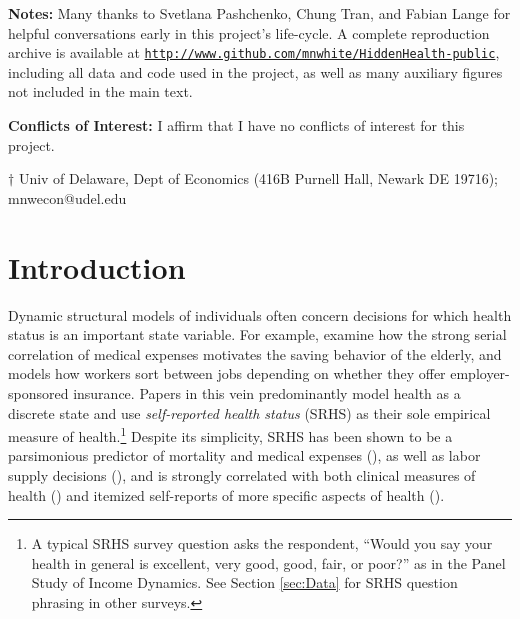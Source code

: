 \documentclass[12pt,pdftex,letterpaper]{article}
\begin{document}
\vspace{0.5cm}
\begin{singlespace}
	\noindent \textbf{Notes:} Many thanks to Svetlana Pashchenko, Chung Tran, and Fabian Lange for helpful conversations early in this project's life-cycle.  A complete reproduction archive is available at \href{http://www.github.com/mnwhite/HiddenHealth-public}{\texttt{http://www.github.com/mnwhite/HiddenHealth-public}}, including all data and code used in the project, as well as many auxiliary figures not included in the main text.
	
	\vspace{0.5cm}
	
	\noindent \textbf{Conflicts of Interest:} I affirm that I have no conflicts of interest for this project.
	
	\vspace{1cm}
	
	\small
	\noindent $\dagger$ Univ of Delaware, Dept of Economics (416B Purnell Hall, Newark DE 19716);  mnwecon@udel.edu
\end{singlespace}


\thispagestyle{empty}

\newpage

\setcounter{page}{1}


\newlength{\TableWidth}

\section{Introduction}\label{sec:Intro}

Dynamic structural models of individuals often concern decisions for which health status is an important state variable.  For example, \cite{DeNardi10} examine how the strong serial correlation of medical expenses motivates the saving behavior of the elderly, and \cite{Aizawa19} models how workers sort between jobs depending on whether they offer employer-sponsored insurance.  Papers in this vein predominantly model health as a discrete state and use \textit{self-reported health status} (SRHS) as their sole empirical measure of health.\footnote{A typical SRHS survey question asks the respondent, ``Would you say your health in general is excellent, very good, good, fair, or poor?'' as in the Panel Study of Income Dynamics. See Section \ref{sec:Data} for SRHS question phrasing in other surveys.}  Despite its simplicity, SRHS has been shown to be a parsimonious predictor of mortality and medical expenses (\cite{Idler97}), as well as labor supply decisions (\cite{Bound91}), and is strongly correlated with both clinical measures of health (\cite{LaRue79}) and itemized self-reports of more specific aspects of health (\cite{Blundell17}).
\end{document}
